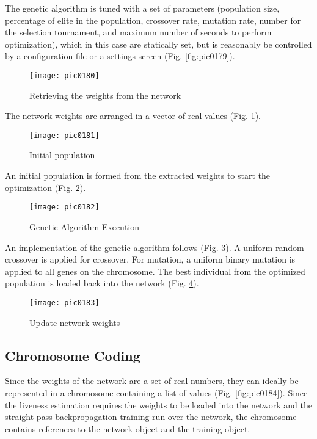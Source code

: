 The genetic algorithm is tuned with a set of parameters (population size, percentage of elite in the population, crossover rate, mutation rate, number for the selection tournament, and maximum number of seconds to perform optimization), which in this case are statically set, but is reasonably be controlled by a configuration file or a settings screen (Fig. \ref{fig:pic0179}).

\begin{figure}[h]
\centering
\texttt{[image: pic0180]}
\caption{Retrieving the weights from the network}
\label{fig:pic0180}
\end{figure}
\FloatBarrier

The network weights are arranged in a vector of real values (Fig. \ref{fig:pic0180}).

\begin{figure}[h]
\centering
\texttt{[image: pic0181]}
\caption{Initial population}
\label{fig:pic0181}
\end{figure}
\FloatBarrier

An initial population is formed from the extracted weights to start the optimization (Fig. \ref{fig:pic0181}).

\begin{figure}[h]
\centering
\texttt{[image: pic0182]}
\caption{Genetic Algorithm Execution}
\label{fig:pic0182}
\end{figure}
\FloatBarrier

An implementation of the genetic algorithm follows (Fig. \ref{fig:pic0182}). A uniform random crossover is applied for crossover. For mutation, a uniform binary mutation is applied to all genes on the chromosome. The best individual from the optimized population is loaded back into the network (Fig. \ref{fig:pic0183}).

\begin{figure}[h]
\centering
\texttt{[image: pic0183]}
\caption{Update network weights}
\label{fig:pic0183}
\end{figure}
\FloatBarrier

\subsection{Chromosome Coding}

Since the weights of the network are a set of real numbers, they can ideally be represented in a chromosome containing a list of values (Fig. \ref{fig:pic0184}). Since the liveness estimation requires the weights to be loaded into the network and the straight-pass backpropagation training run over the network, the chromosome contains references to the network object and the training object.

